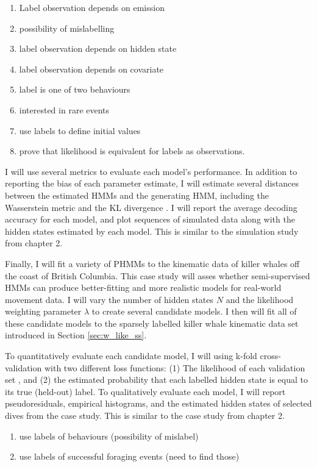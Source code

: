 \begin{enumerate}
    \item Label observation depends on emission
    \item possibility of mislabelling
    \item label observation depends on hidden state
    \item label observation depends on covariate
    \item label is one of two behaviours
    \item interested in rare events
    \item use labels to define initial values
    \item prove that likelihood is equivalent for labels as observations.
\end{enumerate}

I will use several metrics to evaluate each model's performance. In addition to reporting the bias of each parameter estimate, I will estimate several distances between the estimated HMMs and the generating HMM, including the Wasserstein metric \citep{Chen:2020} and the KL divergence \citep{Kullback:1951}. I will report the average decoding accuracy for each model, and plot sequences of simulated data along with the hidden states estimated by each model. This is similar to the simulation study from chapter 2.


Finally, I will fit a variety of PHMMs to the kinematic data of killer whales off the coast of British Columbia. This case study will asses whether semi-supervised HMMs can produce better-fitting and more realistic models for real-world movement data. I will vary the number of hidden states $N$ and the likelihood weighting parameter $\lambda$ to create several candidate models. I then will fit all of these candidate models to the sparsely labelled killer whale kinematic data set introduced in Section \ref{sec:w_like_ss}. 

To quantitatively evaluate each candidate model, I will using k-fold cross-validation with two different loss functions: (1) The likelihood of each validation set \citep{Celeux:2008}, and (2) the estimated probability that each labelled hidden state is equal to its true (held-out) label. To qualitatively evaluate each model, I will report pseudoresiduals, empirical histograms, and the estimated hidden states of selected dives from the case study. This is similar to the case study from chapter 2.

\begin{enumerate}
    \item use labels of behaviours (possibility of mislabel)
    \item use labels of successful foraging events (need to find those)
\end{enumerate}

\fi
